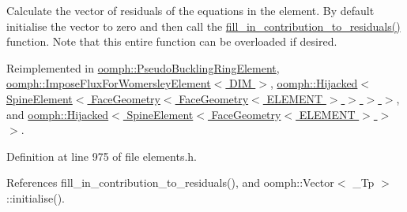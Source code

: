 Calculate the vector of residuals of the equations in the element. By default initialise the vector to zero and then call the \hyperlink{classoomph_1_1GeneralisedElement_a310c97f515e8504a48179c0e72c550d7}{fill\+\_\+in\+\_\+contribution\+\_\+to\+\_\+residuals()} function. Note that this entire function can be overloaded if desired. 



Reimplemented in \hyperlink{classoomph_1_1PseudoBucklingRingElement_ad4f6c2b06b3f114dd08db33781484641}{oomph\+::\+Pseudo\+Buckling\+Ring\+Element}, \hyperlink{classoomph_1_1ImposeFluxForWomersleyElement_a6109bae3e5eb55b567e7ea85fca10884}{oomph\+::\+Impose\+Flux\+For\+Womersley\+Element$<$ D\+I\+M $>$}, \hyperlink{classoomph_1_1Hijacked_adb1760705326df86f6289cc3774d37b9}{oomph\+::\+Hijacked$<$ Spine\+Element$<$ Face\+Geometry$<$ Face\+Geometry$<$ E\+L\+E\+M\+E\+N\+T $>$ $>$ $>$ $>$}, and \hyperlink{classoomph_1_1Hijacked_adb1760705326df86f6289cc3774d37b9}{oomph\+::\+Hijacked$<$ Spine\+Element$<$ Face\+Geometry$<$ E\+L\+E\+M\+E\+N\+T $>$ $>$ $>$}.



Definition at line 975 of file elements.\+h.



References fill\+\_\+in\+\_\+contribution\+\_\+to\+\_\+residuals(), and oomph\+::\+Vector$<$ \+\_\+\+Tp $>$\+::initialise().



